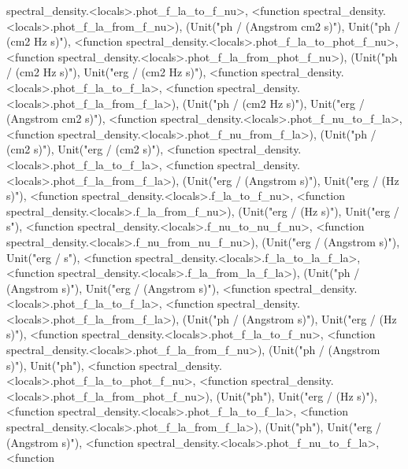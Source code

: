 \documentclass[letterpaper,10pt,english]{sphinxmanual}
\begin{document}
\begin{fulllineitems}
spectral\_density.\textless{}locals\textgreater{}.phot\_f\_la\_to\_f\_nu\textgreater{}, \textless{}function spectral\_density.\textless{}locals\textgreater{}.phot\_f\_la\_from\_f\_nu\textgreater{}), (Unit("ph / (Angstrom cm2 s)"), Unit("ph / (cm2 Hz s)"), \textless{}function spectral\_density.\textless{}locals\textgreater{}.phot\_f\_la\_to\_phot\_f\_nu\textgreater{}, \textless{}function spectral\_density.\textless{}locals\textgreater{}.phot\_f\_la\_from\_phot\_f\_nu\textgreater{}), (Unit("ph / (cm2 Hz s)"), Unit("erg / (cm2 Hz s)"), \textless{}function spectral\_density.\textless{}locals\textgreater{}.phot\_f\_la\_to\_f\_la\textgreater{}, \textless{}function spectral\_density.\textless{}locals\textgreater{}.phot\_f\_la\_from\_f\_la\textgreater{}), (Unit("ph / (cm2 Hz s)"), Unit("erg / (Angstrom cm2 s)"), \textless{}function spectral\_density.\textless{}locals\textgreater{}.phot\_f\_nu\_to\_f\_la\textgreater{}, \textless{}function spectral\_density.\textless{}locals\textgreater{}.phot\_f\_nu\_from\_f\_la\textgreater{}), (Unit("ph / (cm2 s)"), Unit("erg / (cm2 s)"), \textless{}function spectral\_density.\textless{}locals\textgreater{}.phot\_f\_la\_to\_f\_la\textgreater{}, \textless{}function spectral\_density.\textless{}locals\textgreater{}.phot\_f\_la\_from\_f\_la\textgreater{}), (Unit("erg / (Angstrom s)"), Unit("erg / (Hz s)"), \textless{}function spectral\_density.\textless{}locals\textgreater{}.f\_la\_to\_f\_nu\textgreater{}, \textless{}function spectral\_density.\textless{}locals\textgreater{}.f\_la\_from\_f\_nu\textgreater{}), (Unit("erg / (Hz s)"), Unit("erg / s"), \textless{}function spectral\_density.\textless{}locals\textgreater{}.f\_nu\_to\_nu\_f\_nu\textgreater{}, \textless{}function spectral\_density.\textless{}locals\textgreater{}.f\_nu\_from\_nu\_f\_nu\textgreater{}), (Unit("erg / (Angstrom s)"), Unit("erg / s"), \textless{}function spectral\_density.\textless{}locals\textgreater{}.f\_la\_to\_la\_f\_la\textgreater{}, \textless{}function spectral\_density.\textless{}locals\textgreater{}.f\_la\_from\_la\_f\_la\textgreater{}), (Unit("ph / (Angstrom s)"), Unit("erg / (Angstrom s)"), \textless{}function spectral\_density.\textless{}locals\textgreater{}.phot\_f\_la\_to\_f\_la\textgreater{}, \textless{}function spectral\_density.\textless{}locals\textgreater{}.phot\_f\_la\_from\_f\_la\textgreater{}), (Unit("ph / (Angstrom s)"), Unit("erg / (Hz s)"), \textless{}function spectral\_density.\textless{}locals\textgreater{}.phot\_f\_la\_to\_f\_nu\textgreater{}, \textless{}function spectral\_density.\textless{}locals\textgreater{}.phot\_f\_la\_from\_f\_nu\textgreater{}), (Unit("ph / (Angstrom s)"), Unit("ph"), \textless{}function spectral\_density.\textless{}locals\textgreater{}.phot\_f\_la\_to\_phot\_f\_nu\textgreater{}, \textless{}function spectral\_density.\textless{}locals\textgreater{}.phot\_f\_la\_from\_phot\_f\_nu\textgreater{}), (Unit("ph"), Unit("erg / (Hz s)"), \textless{}function spectral\_density.\textless{}locals\textgreater{}.phot\_f\_la\_to\_f\_la\textgreater{}, \textless{}function spectral\_density.\textless{}locals\textgreater{}.phot\_f\_la\_from\_f\_la\textgreater{}), (Unit("ph"), Unit("erg / (Angstrom s)"), \textless{}function spectral\_density.\textless{}locals\textgreater{}.phot\_f\_nu\_to\_f\_la\textgreater{}, \textless{}function 
\end{fulllineitems}
\end{document}
